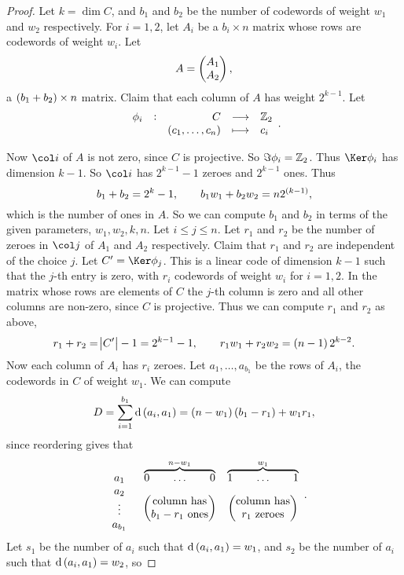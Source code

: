 \begin{proof}
Let $ k = \dim C $, and $ b_1 $ and $ b_2 $ be the number of codewords of weight $ w_1 $ and $ w_2 $ respectively. For $ i = 1, 2 $, let $ A_i $ be a $ b_i \times n $ matrix whose rows are codewords of weight $ w_i $. Let
$$ A = \begin{pmatrix} A_1 \\ A_2 \end{pmatrix}, $$
a $ \br{b_1 + b_2} \times n $ matrix. Claim that each column of $ A $ has weight $ 2^{k - 1} $. Let
$$ \function[\phi_i]{C}{\ZZ_2}{\br{c_1, \dots, c_n}}{c_i}. $$

\pagebreak

Now $ \col i $ of $ A $ is not zero, since $ C $ is projective. So $ \Im \phi_i = \mathbb{Z}_2 $. Thus $ \Ker \phi_i $ has dimension $ k - 1 $. So $ \col i $ has $ 2^{k - 1} - 1 $ zeroes and $ 2^{k - 1} $ ones. Thus
$$ b_1 + b_2 = 2^k - 1, \qquad b_1w_1 + b_2w_2 = n2^{\br{k - 1}}, $$
which is the number of ones in $ A $. So we can compute $ b_1 $ and $ b_2 $ in terms of the given parameters, $ w_1, w_2, k, n $. Let $ i \le j \le n $. Let $ r_1 $ and $ r_2 $ be the number of zeroes in $ \col j $ of $ A_1 $ and $ A_2 $ respectively. Claim that $ r_1 $ and $ r_2 $ are independent of the choice $ j $. Let $ C' = \Ker \phi_j $. This is a linear code of dimension $ k - 1 $ such that the $ j $-th entry is zero, with $ r_i $ codewords of weight $ w_i $ for $ i = 1, 2 $. In the matrix whose rows are elements of $ C $ the $ j $-th column is zero and all other columns are non-zero, since $ C $ is projective. Thus we can compute $ r_1 $ and $ r_2 $ as above,
$$ r_1 + r_2 = \abs{C'} - 1 = 2^{k - 1} - 1, \qquad r_1w_1 + r_2w_2 = \br{n - 1}2^{k - 2}. $$
Now each column of $ A_i $ has $ r_i $ zeroes. Let $ a_1, \dots, a_{b_1} $ be the rows of $ A_i $, the codewords in $ C $ of weight $ w_1 $. We can compute
$$ D = \sum_{i = 1}^{b_1} \d\br{a_i, a_1} = \br{n - w_1}\br{b_1 - r_1} + w_1r_1, $$
since reordering gives that
$$
\begin{array}{ccc}
a_1 & \overbrace{0 \qquad \dots \qquad 0}^{n - w_1} & \overbrace{1 \qquad \dots \qquad 1}^{w_1} \\
\begin{array}{c}
a_2 \\
\vdots \\
a_{b_1}
\end{array}
& \begin{pmatrix} \text{column has} \\ b_1 - r_1 \ \text{ones} \end{pmatrix} & \begin{pmatrix} \text{column has} \\ r_1 \ \text{zeroes} \end{pmatrix}
\end{array}.
$$
Let $ s_1 $ be the number of $ a_i $ such that $ \d\br{a_i, a_1} = w_1 $, and $ s_2 $ be the number of $ a_i $ such that $ \d\br{a_i, a_1} = w_2 $, so

\end{proof}

